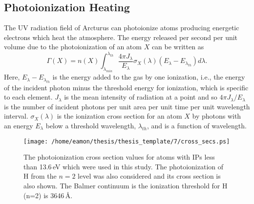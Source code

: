 \subsection{Photoionization Heating}\label{sec:7.4.1}
The UV radiation field of Arcturus can photoionize atoms producing energetic electrons which heat the atmosphere. The energy released per second per unit volume due to the photoionization of an atom $X$ can be written as
\begin{equation}\label{eq:7.20}
\Gamma (X) = n(X)\int ^{\lambda _{th}}_{\lambda _{min}}\frac{4\pi J_{\lambda}}{E _{\lambda}}\sigma _{X}(\lambda)(E_{\lambda} - E_{\lambda _{th}})d\lambda .
\end{equation}
Here, $E_{\lambda} - E_{\lambda _{th}}$ is the energy added to the gas by one ionization, i.e., the energy of the incident photon minus the threshold energy for ionization, which is specific to each element. $J_{\lambda}$ is the 
mean intensity of radiation at a point and so $4\pi J_{\lambda}/E _{\lambda}$ is the number of incident photons per unit area per unit time per unit wavelength interval. $\sigma _{X}(\lambda)$ is the ionization cross section for an atom $X$ by photons with an energy $E_{\lambda}$ below a threshold wavelength, $\lambda _{th}$, and is a function of wavelength.

\begin{figure}[!ht]
\centering 
         \texttt{[image: /home/eamon/thesis/thesis\_template/7/cross\_secs.ps]}
\caption[Photoionization cross section values]{The photoionization cross section values for atoms with IPs less than 13.6\,eV which were used in this study. The photoionization of H from the $n=2$ level was also considered and its cross section is also shown. The Balmer continuum is the ionization threshold for H\,(n=2) is 3646\,\AA .}
\label{fig:7.3}
\end{figure}

